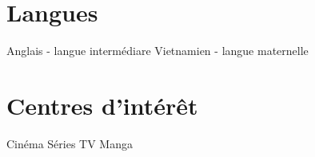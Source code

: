 \smallskip
\begin{minipage}{\textwidth}
	\begin{minipage}[t]{.58\textwidth}
		\section{Langues}
		Anglais - langue intermédiare \hfill\vrule\hfill  Vietnamien - langue maternelle
	\end{minipage}
	\vrule
	\begin{minipage}[t]{.02\textwidth}
	\end{minipage}
	\begin{minipage}[t]{.4\textwidth}
		\section{Centres d'intérêt}
		\hfill Cinéma \hfill\vrule\hfill Séries TV \hfill\vrule\hfill Manga\hfill
	\end{minipage}
\end{minipage}
